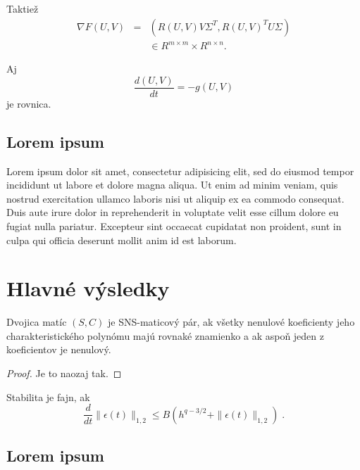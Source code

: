 \documentclass{svk_long_sk}
\begin{document}
Taktiež
\begin{eqnarray}
 \nabla F(U,V) &=& (R(U,V)V\Sigma^{T},R(U,V)^{T}U\Sigma )\nonumber\\
 && \in R^{m \times m} \times R^{n \times n}.   \label{eq2.12}
\end{eqnarray}

Aj
\begin{equation}
\frac{d(U,V)}{dt} = -g(U,V) 	\label{eq2.15}
\end{equation}
je rovnica.

\subsection{Lorem ipsum}

Lorem ipsum dolor sit amet, consectetur adipisicing elit, sed do eiusmod tempor incididunt ut labore et dolore magna aliqua. Ut enim ad minim veniam, quis nostrud exercitation ullamco laboris nisi ut aliquip ex ea commodo consequat. Duis aute irure dolor in reprehenderit in voluptate velit esse cillum dolore eu fugiat nulla pariatur. Excepteur sint occaecat cupidatat non proident, sunt in culpa qui officia deserunt mollit anim id est laborum.
 
\section{Hlavné výsledky} 
 
\begin{theorem} 
\label{th:prop} 
Dvojica matíc $(S,C)$ je {\rm SNS}-maticový pár, ak všetky nenulové
koeficienty jeho charakteristického polynómu majú rovnaké znamienko a
ak aspoň jeden z koeficientov je nenulový.
\end{theorem} 
 
\begin{proof}
Je to naozaj tak. \qquad\end{proof} 
 
\begin{lemma}[{\rm Stabilita}]
\label{stability}
Stabilita je fajn, ak
\begin{equation}
\label{Gron}
\frac {d}{dt} \| \epsilon (t) \| _{1,2}  \leq B
   ( h^{q-3/2} + \| \epsilon (t) \|_{1,2})\;.
\end{equation}
\end{lemma}

\subsection{Lorem ipsum}
\end{document}

